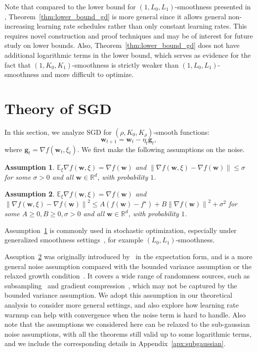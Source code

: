 \documentclass{article}
\newtheorem{assumption}{Assumption}
\newcommand{\Norm}[1]{\left\|#1\right\|}
\newcommand{\Kr}{K_{\rho}}
\newcommand{\paren}[1]{\left( #1 \right)}
\newcommand{\bw}{\mathbf{w}}
\newcommand{\bg}{\mathbf{g}}
\newcommand{\EE}{\mathbb{E}}
\begin{document}
Note that compared to the lower bound for $(1,L_0,L_1)$-smoothness presented in \cite{zhang2020gradient}, 
Theorem~\ref{thm:lower_bound_gd} is more general since it allows general non-increasing learning rate schedules rather than only constant learning rates. This requires novel construction and proof techniques and may be of interest for future study on lower bounds.
Also, Theorem~\ref{thm:lower_bound_gd} does not have additional logarithmic terms in the lower bound, which serves as evidence for the fact that $(1,K_0,K_1)$-smoothness is strictly weaker than $(1,L_0,L_1)$-smoothness and more difficult to optimize.






\section{Theory of SGD}\label{sec:SGD}
In this section, we analyze SGD for $(\rho,K_0,\Kr)$-smooth functions:
$$\bw_{t+1}=\bw_t-\eta_t\bg_t,$$
where $\bg_t=\nabla f(\bw_t,\xi_t)$. We first make the following assumptions on the noise.

\begin{assumption}\label{assumption:a.s.bounded}
    $\EE_\xi \nabla f(\bw,\xi)=\nabla f(\bw)$ and $\Norm{\nabla f(\bw,\xi)-\nabla f(\bw)}\leq \sigma$ for some $\sigma>0$ and all $\bw\in\mathbb{R}^d$, with probability $1$.
\end{assumption}

\begin{assumption}\label{assumption:a.s.ABC}
    $\EE_\xi \nabla f(\bw,\xi)=\nabla f(\bw)$ and $\Norm{\nabla f(\bw,\xi)-\nabla f(\bw)}^2\leq A\paren{f(\bw)-f^\star}+B\Norm{\nabla f(\bw)}^2+ \sigma^2$ for some $A\geq0,B\geq 0, \sigma>0$ and all $\bw\in\mathbb{R}^d$, with probability $1$.
\end{assumption}

Assumption~\ref{assumption:a.s.bounded} is commonly used in stochastic optimization, especially under generalized smoothness settings~\citep{zhang2020improved, zhang2020gradient, li2023convergence, crawshaw2022robustness}, for example $(L_0,L_1)$-smoothness.

Assuption~\ref{assumption:a.s.ABC} was originally introduced by~\cite{khaled2023better} in the expectation form, and is a more general noise assumption compared with the bounded variance assumption or the relaxed growth condition~\citep{bottou2018optimization}.
It covers a wide range of randomness sources, such as subsampling~\citep{gower2019sgd} and gradient compression~\citep{alistarh2017qsgd, khirirat2018distributed}, which may not be captured by the bounded variance assumption. We adopt this assumption in our theoretical analysis to consider more general settings, and also explore how learning rate warmup can help with convergence when the noise term is hard to handle.
Also note that the assumptions we considered here can be relaxed to the sub-gaussian noise assumptions, with all the theorems still valid up to some logarithmic terms, and we include the corresponding details in Appendix~\ref{apx:subgaussian}.
\end{document}
